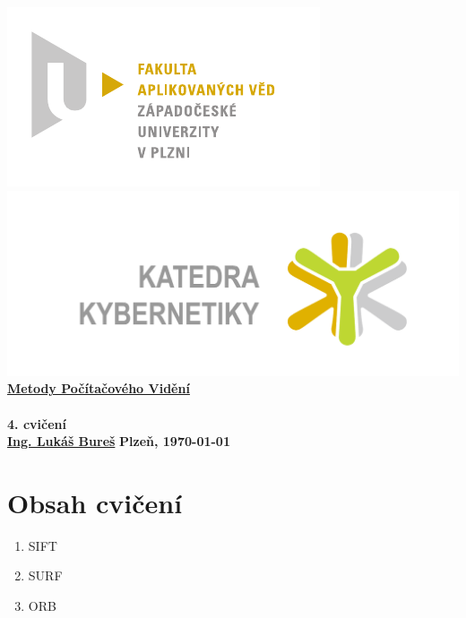 \documentclass[12pt, a4paper]{article}
\newcommand{\cisloCviceni}{4. cvičení}
\begin{document}
 









 
\begin{titlepage}
\begin{center}
	\includegraphics[trim = 0.6cm 0.5cm 0.9cm 0.5cm, scale=1]{./FAV_logo_cz.pdf}
	\hspace*{\fill}
	\includegraphics[trim = 3.5cm 1.5cm 2.6cm 2cm, scale=0.295]{./KKY_logo_cz.pdf}\\
	\vspace*{\fill}
	\textbf{\Huge{\href{http://www.kky.zcu.cz/cs/courses/mpv}{Metody Počítačového Vidění} \\ ~ \\ \cisloCviceni}}\\
	\vspace*{\fill}
	\textbf{\large{\href{mailto:LBures@kky.zcu.cz}{Ing. Lukáš Bureš}}} \hfill \textbf{\large{Plzeň, \today}}
\end{center}
\end{titlepage}












\section*{Obsah cvičení}
\begin{enumerate}
	\item SIFT
	\item SURF
	\item ORB
\end{enumerate}
\end{document}
